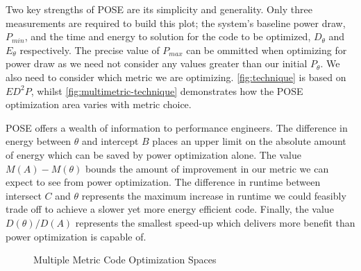 Two key strengths of POSE are its simplicity and generality.
Only three measurements are required to build this plot; the system's baseline power draw, $P_{min}$, and the time and energy to solution for the code to be optimized, $D_\theta$ and $E_\theta$ respectively.
The precise value of $P_{max}$ can be ommitted when optimizing for power draw as we need not consider any values greater than our initial $P_\theta$.
We also need to consider which metric we are optimizing. \autoref{fig:technique} is based on $ED^2P$, whilst \autoref{fig:multimetric-technique} demonstrates how the POSE optimization area varies with metric choice.

POSE offers a wealth of information to performance engineers.
The difference in energy between $\theta$ and intercept $B$ places an upper limit on the absolute amount of energy which can be saved by power optimization alone.
The value $M(A) - M(\theta)$ bounds the amount of improvement in our metric we can expect to see from power optimization.
The difference in runtime between intersect $C$ and $\theta$ represents the maximum increase in runtime we could feasibly trade off to achieve a slower yet more energy efficient code.
Finally, the value $D(\theta) / D(A)$ represents the smallest speed-up which delivers more benefit than power optimization is capable of.

\begin{figure}
\centering

\caption{Multiple Metric Code Optimization Spaces}
\label{fig:multimetric-technique}
\end{figure}
